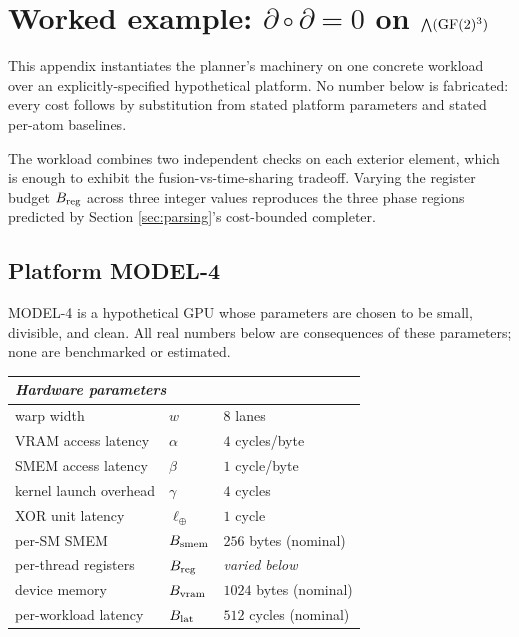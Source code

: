 \section{Worked example: $\partial \circ \partial = 0$ on $\bigwedge(\operatorname{GF}(2)^3)$}
\label{app:examples}

This appendix instantiates the planner's machinery
on one concrete workload over an explicitly-specified
hypothetical platform. No number below is fabricated:
every cost follows by substitution from stated
platform parameters and stated per-atom baselines.

The workload combines two independent checks on each
exterior element, which is enough to exhibit the
fusion-vs-time-sharing tradeoff. Varying the register
budget $B_{\operatorname{reg}}$ across three integer values
reproduces the three phase regions predicted by
Section \ref{sec:parsing}'s cost-bounded completer.

\subsection{Platform MODEL-4}\label{app-e:platform}

MODEL-4 is a hypothetical GPU whose parameters are
chosen to be small, divisible, and clean. All real
numbers below are consequences of these parameters;
none are benchmarked or estimated.

\begin{center}
\begin{tabular}{ll|l}
\multicolumn{2}{l|}{\emph{Hardware parameters}} & \\
\hline
warp width             & $w$     & $8$ lanes \\
VRAM access latency    & $\alpha$ & $4$ cycles/byte \\
SMEM access latency    & $\beta$  & $1$ cycle/byte \\
kernel launch overhead & $\gamma$ & $4$ cycles \\
XOR unit latency       & $\ell_\oplus$ & $1$ cycle \\
per-SM SMEM            & $B_{\operatorname{smem}}$  & $256$ bytes (nominal) \\
per-thread registers   & $B_{\operatorname{reg}}$   & \emph{varied below} \\
device memory          & $B_{\operatorname{vram}}$  & $1024$ bytes (nominal) \\
per-workload latency   & $B_{\operatorname{lat}}$   & $512$ cycles (nominal) \\
\end{tabular}
\end{center}

